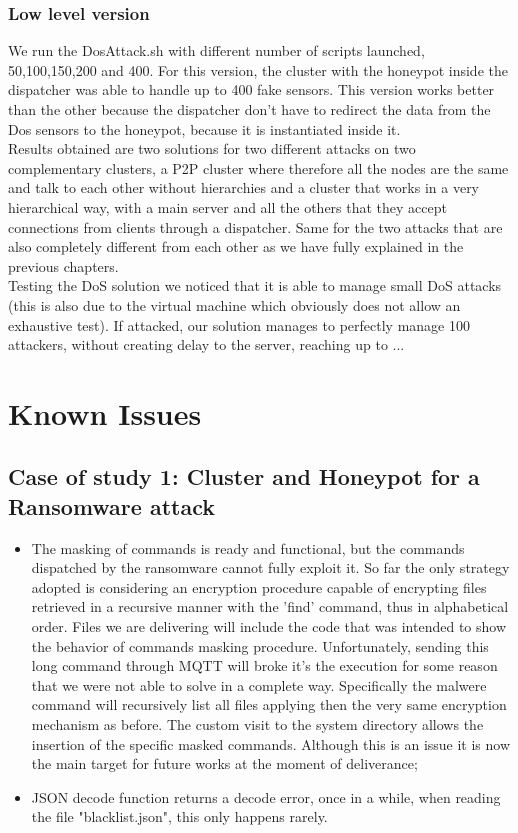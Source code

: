 \subsubsection{Low level version} 
We run the DosAttack.sh with different number of scripts launched, 50,100,150,200 and 400. For this version, the cluster with the honeypot inside the dispatcher was able to handle up to 400 fake sensors. 
This version works better than the other because the dispatcher don't have to redirect the data from the Dos sensors to the honeypot, because it is instantiated inside it.\\
Results obtained are two solutions for two different attacks on two complementary clusters, a P2P cluster where therefore all the nodes are the same and talk to each other without hierarchies and a cluster that works in a very hierarchical way, with a main server and all the others that they accept connections from clients through a dispatcher.
Same for the two attacks that are also completely different from each other as we have fully explained in the previous chapters.\\
Testing the DoS solution we noticed that it is able to manage small DoS attacks (this is also due to the virtual machine which obviously does not allow an exhaustive test). If attacked, our solution manages to perfectly manage 100 attackers, without creating delay to the server, reaching up to ...

\section{Known Issues}

\subsection{Case of study 1: Cluster and Honeypot for a Ransomware attack}

\begin{itemize}
    \item The masking of commands is ready and functional, but the commands dispatched by the ransomware cannot fully exploit it. So far the only strategy adopted is considering an encryption procedure capable of encrypting files retrieved in a recursive manner with the 'find' command, thus in alphabetical order. 
    Files we are delivering will include the code that was intended to show the behavior of commands masking procedure. Unfortunately, sending this long command through MQTT will broke it's the execution for some reason that we were not able to solve in a complete way. Specifically the malwere command will recursively list all files applying then the very same encryption mechanism as before. The custom visit to the system directory allows the insertion of the specific masked commands.
    Although this is an issue it is now the main target for future works at the moment of deliverance;
    \item JSON decode function returns a decode error, once in a while, when reading the file "blacklist.json", this only happens rarely.
\end{itemize}

